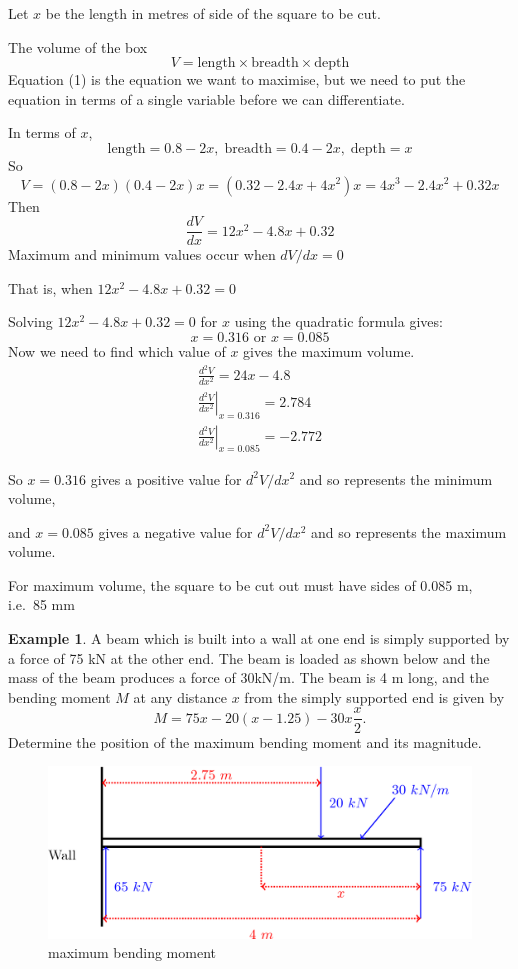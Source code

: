 \documentclass[
  11pt,
  oneside]{book}
\newcommand{\slide}{}
\theoremstyle{definition}
\theoremstyle{definition}
\newtheorem{example}{Example}[chapter]
\theoremstyle{definition}
\theoremstyle{definition}
\theoremstyle{remark}
\begin{document}
Let \(x\) be the length in metres of side of the square to be cut.

The volume of the box
\[
V = \text{length}\times\text{breadth}\times\text{depth}\tag{1}
\]
Equation (1) is the equation we want to maximise, but we need to put the equation in terms of a single variable before we can differentiate.

In terms of \(x\),
\[
\text{length} = 0.8 - 2x,\; \text{breadth} = 0.4 - 2x,\;\text{depth} = x
\]
So
\[
V = (0.8 - 2x)(0.4 - 2x)x = (0.32 - 2.4x + 4x^2)x = 4x^3 - 2.4x^2 + 0.32x
\]
Then
\[
\frac{dV}{dx} = 12x^2 - 4.8x + 0.32
\]
Maximum and minimum values occur when \(dV/dx = 0\)

That is, when \(12x^2 - 4.8x + 0.32= 0\)

Solving \(12x^2 - 4.8x + 0.32= 0\) for \(x\) using the quadratic formula gives:
\[
 x = 0.316\text{ or }x = 0.085
\]
Now we need to find which value of \(x\) gives the maximum volume.
\begin{gather*}
\frac{d^2V}{dx^2}= 24x - 4.8\\
\left.\frac{d^2V}{dx^2}\right\vert_{x=0.316} = 2.784\\
\left.\frac{d^2V}{dx^2}\right\vert_{x=0.085} = -2.772
\end{gather*}

\slide

So \(x=0.316\) gives a positive value for \(d^2V/dx^2\) and so represents the minimum volume,

and \(x=0.085\) gives a negative value for \(d^2V/dx^2\) and so represents the maximum volume.

For maximum volume, the square to be cut out must have sides of 0.085 m, i.e.~85 mm
\slide

\begin{example}
A beam which is built into a wall at one end is simply supported by a force of 75 kN at the other end. The beam is loaded as shown below and the mass of the beam produces a force of 30kN/m. The beam is 4 m long, and the bending moment \(M\) at any distance \(x\) from the simply supported end is given by
\[
M = 75x-20(x-1.25)-30x\frac{x}{2}.
\]
Determine the position of the maximum bending moment and its magnitude.
\end{example}

\begin{figure}

{\centering \includegraphics[width=0.55\linewidth]{tikztopng-figure14} 

}

\caption{maximum bending moment}\label{fig:unnamed-chunk-29}
\end{figure}
\end{document}
